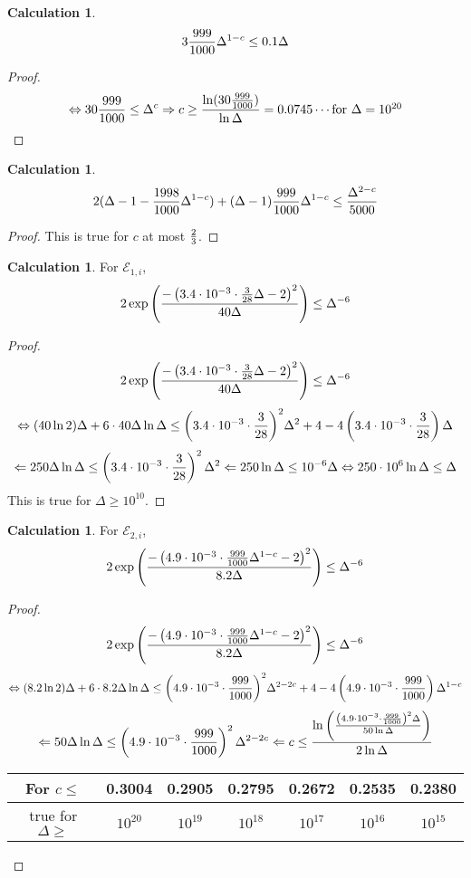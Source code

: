 \documentclass[12pt]{article}
\theoremstyle{definition}
\newtheorem{calculation}[theorem]{Calculation}
\newcommand{\lra}{\Leftrightarrow}
\newcommand{\ra}{\Rightarrow}
\newcommand{\la}{\Leftarrow}
\begin{document}
\begin{calculation}\label{2A}
$$3{999\over 1000}\Delta^{1-c}\leq 0.1\Delta$$
\end{calculation}
\begin{proof}
$$\lra 30{999\over 1000}\leq \Delta^c
\ra c\geq {\ln(30{999\over 1000})\over \ln \Delta}=0.0745\cdots\mbox{for $\Delta=10^{20}$}$$
\end{proof}

\begin{calculation}\label{2az2}
$$2(\Delta-1-{1998\over 1000}\Delta^{1-c}) + (\Delta-1){999\over 1000}\Delta^{1-c} \leq {\Delta^{2-c}\over 5000}$$
\end{calculation}
\begin{proof}
This is true for $c$ at most $2\over 3$.
\end{proof}

\begin{calculation}\label{1cal}
For $\mathcal{E}_{1, i}$,
$$2\exp\left(  {-\left(  3.4\cdot 10^{-3}\cdot {3\over 28}\Delta-2  \right)^2\over 40\Delta}  \right)\leq \Delta^{-6}$$
\end{calculation}
\begin{proof}
$$2\exp\left(  {-\left(  3.4\cdot 10^{-3}\cdot {3\over 28}\Delta-2  \right)^2\over 40\Delta}  \right)\leq \Delta^{-6}$$
$$ \lra (40\ln 2)\Delta + 6\cdot 40\Delta \ln \Delta \leq  {\left( 3.4\cdot 10^{-3}\cdot {3\over 28} \right)^2}\Delta^{2} +4 - 4 \left( 3.4\cdot 10^{-3}\cdot {3\over 28} \right)\Delta$$
$$\la 250\Delta\ln \Delta\leq \left( 3.4\cdot 10^{-3}\cdot {3\over 28} \right)^2\Delta^2
\la 250\ln \Delta\leq 10^{-6}\Delta \lra 250\cdot 10^6\ln \Delta\leq \Delta$$
This is true for $\Delta\geq 10^{10}$.
\end{proof}

\begin{calculation}\label{2cal2}
For $\mathcal{E}_{2, i}$,
$$2\exp\left(  {-\left(  4.9\cdot 10^{-3}\cdot {999\over 1000}\Delta^{1-c}-2  \right)^2\over 8.2\Delta}  \right)\leq \Delta^{-6}$$
\end{calculation}
\begin{proof}
$$2\exp\left(  {-\left(  4.9\cdot 10^{-3}\cdot {999\over 1000}\Delta^{1-c}-2  \right)^2\over 8.2\Delta}  \right)\leq \Delta^{-6}$$
$$ \lra (8.2\ln 2)\Delta + 6\cdot 8.2\Delta \ln \Delta \leq  {\left( 4.9\cdot 10^{-3}\cdot {999\over 1000} \right)^2}\Delta^{2-2c} +4 - 4 \left( 4.9\cdot 10^{-3}\cdot {999\over 1000} \right)\Delta^{1-c}$$
$$\la 50\Delta\ln \Delta\leq \left( 4.9\cdot 10^{-3}\cdot {999\over 1000} \right)^2\Delta^{2-2c}
\la c\leq {\ln\left({\left( 4.9\cdot 10^{-3}\cdot {999\over 1000} \right)^2\Delta\over 50\ln \Delta}\right)\over 2\ln \Delta}$$
\begin{center}
\begin{tabular}{c|c|c|c|c|c|c}
For $c\leq$ & 0.3004 & 0.2905 & 0.2795 & 0.2672 & 0.2535 & 0.2380 \\
\hline
true for $\Delta\geq$ & $10^{20}$ & $10^{19}$ & $10^{18}$ & $10^{17}$ & $10^{16}$ & $10^{15}$
\end{tabular}
\end{center}
\end{proof}
\end{document}
